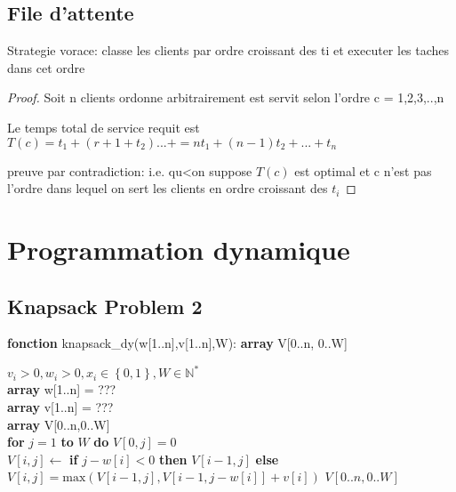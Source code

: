 \documentclass{article}
\theoremstyle{definition}
\theoremstyle{remark}
\newcommand{\pr}[1]{\left( #1 \right)}
\begin{document}
    \subsection{File d'attente}
    Strategie vorace: classe les clients par ordre croissant des ti et executer les taches dans cet ordre
    \begin{proof}
        Soit n clients ordonne arbitrairement est servit selon l'ordre
        c = 1,2,3,..,n
        
        Le temps total de service requit est $T\pr{c} = t_1+ \pr{r+1+t_2}...+ = nt_1 + \pr{n-1}t_2 +...+ t_n$

        preuve par contradiction: i.e. qu<on suppose $T\pr{c}$ est optimal et c n'est pas l'ordre
        dans lequel on sert les clients en ordre croissant des $t_i$
    \end{proof}

\newpage
\section{Programmation dynamique}
\subsection{Knapsack Problem 2}
    \begin{algorithm} 
	\caption{\textbf{fonction} knapsack\_dy(w[1..n],v[1..n],W): \textbf{array} V[0..n, 0..W]
} 
	\label{alg_sacados2} 
	\begin{algorithmic}
		\REQUIRE $v_{i} > 0, w_{i} > 0, x_{i} \in \left\{ 0,1 \right\}, W \in \mathbb{N}^{*} $ \\
		\textbf{array} w[1..n] = ??? \\
		\textbf{array} v[1..n] = ???\\ 
		\textbf{array} V[0..n,0..W]\\ 
		\textbf{for} $j = 1$ \textbf{to} $W$ \textbf{do} $V\left[ 0,j \right] = 0$\\
		\STATE $V[i,j] \gets$ \textbf{if} $j-w[i]<0 $ \textbf{then} $V[i-1,j]$ 
		\STATE \qquad\qquad\;\textbf{else} $V\left[ i,j \right] = \text{max}\left( V[i-1,j], V[i-1,j-w[i]] + v[i] \right) $
		\ENDFOR
		\ENDFOR
		\RETURN $V[0..n,0..W]$
	\end{algorithmic} 
\end{algorithm}
    
\end{document}
